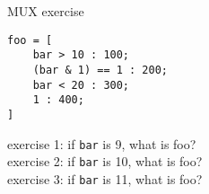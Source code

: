 \begin{frame}[fragile,label=muxExercise]{MUX exercise}
\begin{Verbatim}
foo = [
    bar > 10 : 100;
    (bar & 1) == 1 : 200;
    bar < 20 : 300;
    1 : 400;
]
\end{Verbatim}
exercise 1: if \texttt{bar} is 9, what is foo? \\
exercise 2: if \texttt{bar} is 10, what is foo? \\
exercise 3: if \texttt{bar} is 11, what is foo? \\
\end{frame}
